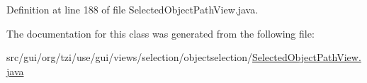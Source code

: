Definition at line 188 of file Selected\-Object\-Path\-View.\-java.



The documentation for this class was generated from the following file\-:\begin{DoxyCompactItemize}
\item 
src/gui/org/tzi/use/gui/views/selection/objectselection/\hyperlink{_selected_object_path_view_8java}{Selected\-Object\-Path\-View.\-java}\end{DoxyCompactItemize}
